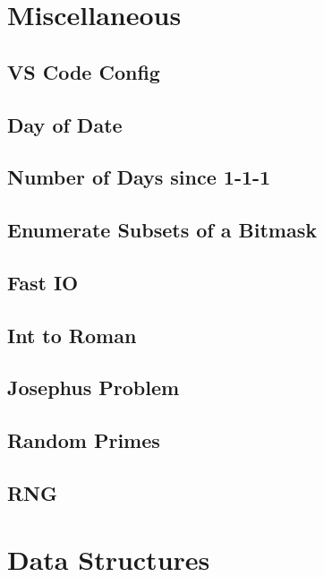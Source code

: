 \section{Miscellaneous}
\subsection{VS Code Config}

\subsection{Day of Date}

\subsection{Number of Days since 1-1-1}

\subsection{Enumerate Subsets of a Bitmask}

\subsection{Fast IO}

\subsection{Int to Roman}

\subsection{Josephus Problem}

\subsection{Random Primes}

\subsection{RNG}

\section{Data Structures}
